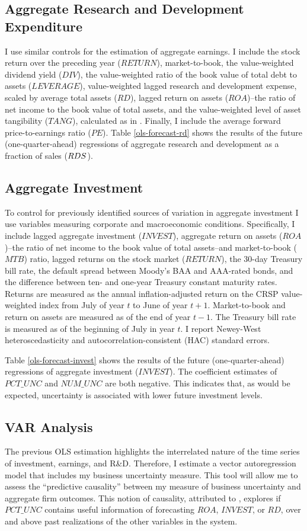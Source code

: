 \documentclass[12pt, letterpaper]{article}
\begin{document}
\subsection{Aggregate Research and Development Expenditure}
I use similar controls for the estimation of aggregate earnings. I include the stock return over the preceding year ($RETURN$), market-to-book, the value-weighted dividend yield ($DIV$), the value-weighted ratio of the book value of total debt to assets ($LEVERAGE$), value-weighted lagged research and development expense, scaled by average total assets ($RD$), lagged return on assets ($ROA$)--the ratio of net income to the book value of total assets, and the value-weighted level of asset tangibility ($TANG$), calculated as in \cite{almeidacampello2007}. Finally, I include the average forward price-to-earnings ratio ($PE$). Table \ref{ols-forecast-rd} shows the results of the future (one-quarter-ahead) regressions of aggregate research and development as a fraction of sales ($RD\-S$). 

\subsection{Aggregate Investment}
To control for previously identified sources of variation in aggregate investment I use variables measuring corporate and macroeconomic conditions. Specifically, I include lagged aggregate investment ($INVEST$), aggregate return on assets ($ROA$)--the ratio of net income to the book value of total assets--and market-to-book ($MTB$) ratio, lagged returns on the stock market ($RETURN$), the 30-day Treasury bill rate, the default spread between Moody's BAA and AAA-rated bonds, and the difference between ten- and one-year Treasury constant maturity rates. Returns are measured as the annual inflation-adjusted return on the CRSP value-weighted index from July of year $t$ to June of year $t+1$. Market-to-book and return on assets are measured as of the end of year $t-1$. The Treasury bill rate is measured as of the beginning of July in year $t$. I report Newey-West heteroscedasticity and autocorrelation-consistent (HAC) standard errors.

Table \ref{ols-forecast-invest} shows the results of the future (one-quarter-ahead) regressions of aggregate investment ($INVEST$). The coefficient estimates of $PCT\_UNC$ and $NUM\_UNC$ are both negative. This indicates that, as would be expected, uncertainty is associated with lower future investment levels.

\subsection{VAR Analysis}
The previous OLS estimation highlights the interrelated nature of the time series of investment, earnings, and R\&D. Therefore, I estimate a vector autoregression model that includes my business uncertainty measure.
This tool will allow me to assess the ``predictive causality'' between my measure of business uncertainty and aggregate firm outcomes. This notion of causality, attributed to \cite{granger1969}, explores if $PCT\_UNC$ contains useful information of forecasting $ROA$, $INVEST$, or $RD$, over and above past realizations of the other variables in the system.
\end{document}
